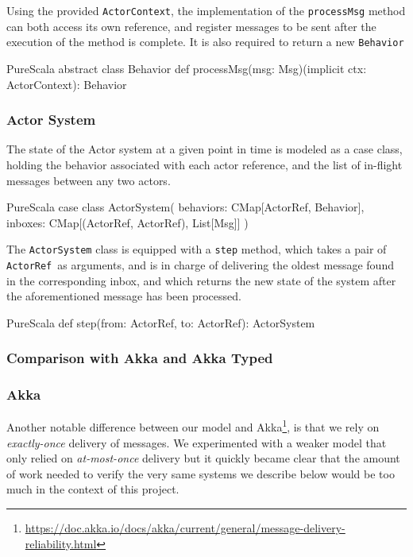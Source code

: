 \documentclass[a4paper,twoside]{article}
\newcommand{\InlineS}[1]{\lstinline[language=PureScala,basicstyle=\small\ttfamily,columns=fixed]|#1|}
\newcommand{\ActorRef}{\InlineS{ActorRef}\ }
\begin{document}
Using the provided \InlineS{ActorContext}, the implementation of the \InlineS{processMsg}
method can both access its own reference, and register messages to be sent after the
execution of the method is complete. It is also required to return a new \InlineS{Behavior}

\begin{ShortCode}{PureScala}
abstract class Behavior {
  def processMsg(msg: Msg)(implicit ctx: ActorContext): Behavior
}
\end{ShortCode}

\vspace{-15pt}
\subsubsection*{Actor System}

The state of the Actor system at a given point in time is modeled as a case class, 
holding the behavior associated with each actor reference, and the list of in-flight messages between any two actors.

\begin{ShortCode}{PureScala}
case class ActorSystem(
  behaviors: CMap[ActorRef, Behavior],
  inboxes: CMap[(ActorRef, ActorRef), List[Msg]]
)
\end{ShortCode}

The \InlineS{ActorSystem} class is equipped with a \InlineS{step} method, which takes 
a pair of \ActorRef as arguments, and is in charge of delivering the oldest message 
found in the corresponding inbox, and which returns the new state of the system after 
the aforementioned message has been processed.

\begin{ShortCode}{PureScala}
def step(from: ActorRef, to: ActorRef): ActorSystem
\end{ShortCode}

\subsubsection{Comparison with Akka and Akka Typed}
\label{comp}

\subsubsection*{Akka}

Another notable difference between our model and Akka\footnote{\url{https://doc.akka.io/docs/akka/current/general/message-delivery-reliability.html}}, is that we rely on \textit{exactly-once} delivery of messages. We experimented with a weaker model that only relied on \textit{at-most-once} delivery but it quickly became clear that the amount of work needed to verify the very same systems we describe below would be too much in the context of this project.
\end{document}
